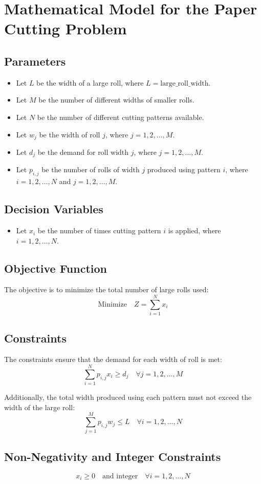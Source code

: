 \documentclass{article}
\begin{document}
\section*{Mathematical Model for the Paper Cutting Problem}

\subsection*{Parameters}
\begin{itemize}
    \item Let \( L \) be the width of a large roll, where \( L = \text{large\_roll\_width} \).
    \item Let \( M \) be the number of different widths of smaller rolls.
    \item Let \( N \) be the number of different cutting patterns available.
    \item Let \( w_j \) be the width of roll \( j \), where \( j = 1, 2, \ldots, M \).
    \item Let \( d_j \) be the demand for roll width \( j \), where \( j = 1, 2, \ldots, M \).
    \item Let \( p_{i,j} \) be the number of rolls of width \( j \) produced using pattern \( i \), where \( i = 1, 2, \ldots, N \) and \( j = 1, 2, \ldots, M \).
\end{itemize}

\subsection*{Decision Variables}
\begin{itemize}
    \item Let \( x_i \) be the number of times cutting pattern \( i \) is applied, where \( i = 1, 2, \ldots, N \).
\end{itemize}

\subsection*{Objective Function}
The objective is to minimize the total number of large rolls used:
\[
\text{Minimize} \quad Z = \sum_{i=1}^{N} x_i
\]

\subsection*{Constraints}
The constraints ensure that the demand for each width of roll is met:
\[
\sum_{i=1}^{N} p_{i,j} x_i \geq d_j \quad \forall j = 1, 2, \ldots, M
\]

Additionally, the total width produced using each pattern must not exceed the width of the large roll:
\[
\sum_{j=1}^{M} p_{i,j} w_j \leq L \quad \forall i = 1, 2, \ldots, N
\]

\subsection*{Non-Negativity and Integer Constraints}
\[
x_i \geq 0 \quad \text{and integer} \quad \forall i = 1, 2, \ldots, N
\]
\end{document}
